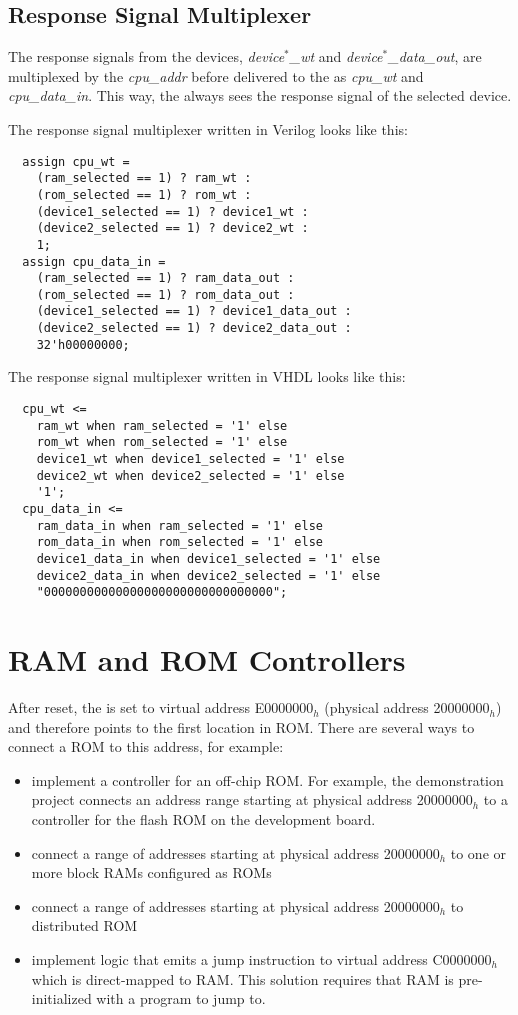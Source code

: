 \subsection{Response Signal Multiplexer}

The response signals from the devices, {\it device$^*$\_wt} and {\it device$^*$\_data\_out}, are multiplexed by the {\it cpu\_addr} before delivered to the \eco as {\it cpu\_wt} and {\it cpu\_data\_in}. This way, the \eco always sees the response signal of the selected device.

The response signal multiplexer written in Verilog looks like this:
\begin{verbatim}
  assign cpu_wt =
    (ram_selected == 1) ? ram_wt :
    (rom_selected == 1) ? rom_wt :
    (device1_selected == 1) ? device1_wt :
    (device2_selected == 1) ? device2_wt :
    1;
  assign cpu_data_in =
    (ram_selected == 1) ? ram_data_out :
    (rom_selected == 1) ? rom_data_out :
    (device1_selected == 1) ? device1_data_out :
    (device2_selected == 1) ? device2_data_out :
    32'h00000000;
\end{verbatim}

The response signal multiplexer written in VHDL looks like this:
\begin{verbatim}
  cpu_wt <=
    ram_wt when ram_selected = '1' else
    rom_wt when rom_selected = '1' else
    device1_wt when device1_selected = '1' else
    device2_wt when device2_selected = '1' else
    '1';
  cpu_data_in <=
    ram_data_in when ram_selected = '1' else
    rom_data_in when rom_selected = '1' else
    device1_data_in when device1_selected = '1' else
    device2_data_in when device2_selected = '1' else
    "00000000000000000000000000000000";
\end{verbatim}

\section{RAM and ROM Controllers}

After reset, the \pc is set to virtual address E0000000$_h$ (physical address 20000000$_h$) and therefore points to the first location in ROM. There are several ways to connect a ROM to this address, for example:
\begin{itemize}
\item implement a controller for an off-chip ROM. For example, the demonstration project connects an address range starting at physical address 20000000$_h$ to a controller for the flash ROM on the development board.
\item connect a range of addresses starting at physical address 20000000$_h$ to one or more block RAMs configured as ROMs
\item connect a range of addresses starting at physical address 20000000$_h$ to distributed ROM
\item implement logic that emits a jump instruction to virtual address C0000000$_h$ which is direct-mapped to RAM. This solution requires that RAM is pre-initialized with a program to jump to.
\end{itemize}


